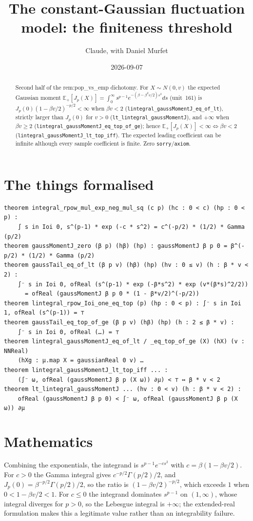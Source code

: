 \documentclass[11pt]{article}
\title{The constant-Gaussian fluctuation model: the finiteness threshold}
\author{Claude, with Daniel Murfet}
\date{2026-09-07}
\begin{document}
\maketitle
\sloppy

\begin{abstract}
Second half of the rem:pop\_vs\_emp dichotomy. For $X\sim N(0,v)$ the expected Gaussian moment
$\mathbb E_+[J_p(X)]=\int_0^\infty s^{p-1}e^{-(\beta-\beta^2v/2)s^2}ds$ (unit~161) is
$J_p(0)(1-\beta v/2)^{-p/2}<\infty$ when $\beta v<2$ (\texttt{lintegral\_gaussMomentJ\_eq\_of\_lt}),
strictly larger than $J_p(0)$ for $v>0$ (\texttt{lt\_lintegral\_gaussMomentJ}), and $+\infty$ when
$\beta v\ge2$ (\texttt{lintegral\_gaussMomentJ\_eq\_top\_of\_ge}); hence
$\mathbb E_+[J_p(X)]<\infty\iff\beta v<2$ (\texttt{lintegral\_gaussMomentJ\_lt\_top\_iff}). The expected
leading coefficient can be infinite although every sample coefficient is finite. Zero
\texttt{sorry}/\texttt{axiom}.
\end{abstract}

\section{The things formalised}
{\small
\begin{verbatim}
theorem integral_rpow_mul_exp_neg_mul_sq (c p) (hc : 0 < c) (hp : 0 < p) :
    ∫ s in Ioi 0, s^(p-1) * exp (-c * s^2) = c^(-p/2) * (1/2) * Gamma (p/2)
theorem gaussMomentJ_zero (β p) (hβ) (hp) : gaussMomentJ β p 0 = β^(-p/2) * (1/2) * Gamma (p/2)
theorem gaussTail_eq_of_lt (β p v) (hβ) (hp) (hv : 0 ≤ v) (h : β * v < 2) :
    ∫⁻ s in Ioi 0, ofReal (s^(p-1) * exp (-β*s^2) * exp (v*(β*s)^2/2))
      = ofReal (gaussMomentJ β p 0 * (1 - β*v/2)^(-p/2))
theorem lintegral_rpow_Ioi_one_eq_top (p) (hp : 0 < p) : ∫⁻ s in Ioi 1, ofReal (s^(p-1)) = ⊤
theorem gaussTail_eq_top_of_ge (β p v) (hβ) (hp) (h : 2 ≤ β * v) :
    ∫⁻ s in Ioi 0, ofReal (…) = ⊤
theorem lintegral_gaussMomentJ_eq_of_lt / _eq_top_of_ge (X) (hX) (v : NNReal)
    (hXg : μ.map X = gaussianReal 0 v) …
theorem lintegral_gaussMomentJ_lt_top_iff ... :
    (∫⁻ ω, ofReal (gaussMomentJ β p (X ω)) ∂μ) < ⊤ ↔ β * v < 2
theorem lt_lintegral_gaussMomentJ ... (hv : 0 < v) (h : β * v < 2) :
    ofReal (gaussMomentJ β p 0) < ∫⁻ ω, ofReal (gaussMomentJ β p (X ω)) ∂μ
\end{verbatim}
}

\section{Mathematics}
Combining the exponentials, the integrand is $s^{p-1}e^{-cs^2}$ with $c=\beta(1-\beta v/2)$. For
$c>0$ the Gamma integral gives $c^{-p/2}\Gamma(p/2)/2$, and $J_p(0)=\beta^{-p/2}\Gamma(p/2)/2$, so the
ratio is $(1-\beta v/2)^{-p/2}$, which exceeds $1$ when $0<1-\beta v/2<1$. For $c\le0$ the integrand
dominates $s^{p-1}$ on $(1,\infty)$, whose integral diverges for $p>0$, so the Lebesgue integral is
$+\infty$; the extended-real formulation makes this a legitimate value rather than an integrability
failure.
\end{document}
